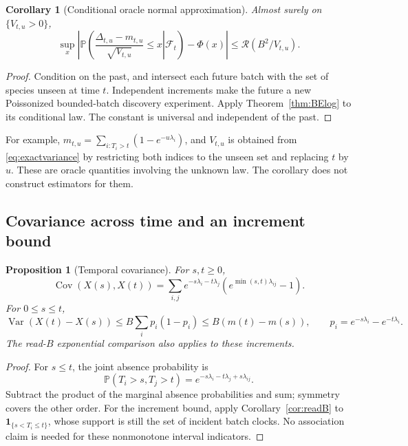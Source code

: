 \documentclass[11pt]{article}
\numberwithin{equation}{section}
\newtheorem{proposition}[theorem]{Proposition}
\newtheorem{corollary}[theorem]{Corollary}
\theoremstyle{definition}
\theoremstyle{remark}
\newcommand{\Pp}{\mathbb P}
\newcommand{\ind}{\mathbf 1}
\newcommand{\Var}{\operatorname{Var}}
\newcommand{\Cov}{\operatorname{Cov}}
\begin{document}
\begin{corollary}[Conditional oracle normal approximation]\label{cor:conditional}
Almost surely on $\{V_{t,u}>0\}$,
\begin{equation}\label{eq:conditionalBE}
 \sup_x\left|\Pp\left(
 \left.\frac{\Delta_{t,u}-m_{t,u}}{\sqrt{V_{t,u}}}\le x
 \right|\mathcal F_t\right)-\Phi(x)\right|
 \le\mathcal R(B^2/V_{t,u}).
\end{equation}
\end{corollary}
\begin{proof}
Condition on the past, and intersect each future batch with the set of species
unseen at time $t$. Independent increments make the future a new Poissonized
bounded-batch discovery experiment. Apply Theorem~\ref{thm:BElog} to its
conditional law. The constant is universal and independent of the past.
\end{proof}

For example,
$m_{t,u}=\sum_{i:T_i>t}(1-e^{-u\lambda_i})$, and $V_{t,u}$ is obtained from
\eqref{eq:exactvariance} by restricting both indices to the unseen set and
replacing $t$ by $u$. These are oracle quantities involving the unknown law.
The corollary does not construct estimators for them.

\subsection{Covariance across time and an increment bound}

\begin{proposition}[Temporal covariance]\label{prop:temporal}
For $s,t\ge0$,
\begin{equation}\label{eq:temporal-cov}
 \Cov(X(s),X(t))
 =\sum_{i,j}e^{-s\lambda_i-t\lambda_j}
       (e^{\min(s,t)\lambda_{ij}}-1).
\end{equation}
For $0\le s\le t$,
\begin{equation}\label{eq:incrementvar}
 \Var(X(t)-X(s))\le B\sum_i p_i(1-p_i)
 \le B(m(t)-m(s)),\qquad p_i=e^{-s\lambda_i}-e^{-t\lambda_i}.
\end{equation}
The read-$B$ exponential comparison also applies to these increments.
\end{proposition}
\begin{proof}
For $s\le t$, the joint absence probability is
\[
 \Pp(T_i>s,T_j>t)=e^{-s\lambda_i-t\lambda_j+s\lambda_{ij}}.
\]
Subtract the product of the marginal absence probabilities and sum; symmetry
covers the other order. For the increment bound, apply
Corollary~\ref{cor:readB} to $\ind_{\{s<T_i\le t\}}$, whose support is still
the set of incident batch clocks. No association claim is needed for these
nonmonotone interval indicators.
\end{proof}
\end{document}
